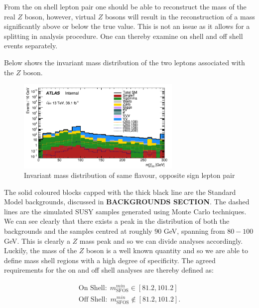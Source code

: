 \noindent From the on shell lepton pair one should be able to reconstruct the mass of the real $Z$ boson, however, virtual $Z$ bosons will result in the reconstruction of a mass significantly above or below the true value.
This is not an issue as it allows for a splitting in analysis procedure. 
One can thereby examine on shell and off shell events separately.

Below shows the invariant mass distribution of the two leptons associated with the $Z$ boson.

\begin{figure}[H] %
   \centering
   \includegraphics[width=0.7\textwidth]{Pictures/ZmassDist.png} 
   \caption{Invariant mass distribution of same flavour, opposite sign lepton pair}
   \label{fig:L1L2InvariantMass}
\end{figure}

\noindent The solid coloured blocks capped with the thick black line are the Standard Model backgrounds, discussed in \textbf{\large BACKGROUNDS SECTION}.
The dashed lines are the simulated SUSY samples generated using Monte Carlo techniques.
We can see clearly that there exists a peak in the distribution of both the backgrounds and the samples centred at roughly $90$ GeV, spanning from $80 - 100$ GeV.
This is clearly a $Z$ mass peak and so we can divide analyses accordingly.
Luckily, the mass of the $Z$ boson is a well known quantity and so we are able to define mass shell regions with a high degree of specificity.
The agreed requirements for the on and off shell analyses are thereby defined as:

\begin{align} 
\textrm{On Shell:}\ \ m_{\textrm{SFOS}}^{min} \in [81.2, 101.2] \\
\textrm{Off Shell:}\ \ m_{\textrm{SFOS}}^{min} \notin [81.2, 101.2].
\end{align}



